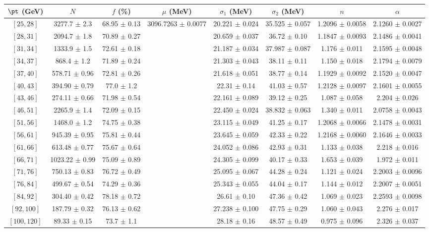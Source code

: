 \begin{tabular}{c||c|c|c|c|c|c|c}
$\pt$ (GeV) & $N$ & $f$ (\%) & $\mu$ (MeV) & $\sigma_1$ (MeV) & $\sigma_2$ (MeV) & $n$ & $\alpha$ \\
\hline
$[25, 28]$ & 3277.7 $\pm$ 2.3 & 68.95 $\pm$ 0.13 & \multirow{17}{*}{3096.7263 $\pm$ 0.0077} & 20.221 $\pm$ 0.024 & 35.525 $\pm$ 0.057 & 1.2096 $\pm$ 0.0058 & 2.1260 $\pm$ 0.0027\\
$[28, 31]$ & 2094.7 $\pm$ 1.8 & 70.89 $\pm$ 0.27 &  & 20.659 $\pm$ 0.037 & 36.72 $\pm$ 0.10 & 1.1847 $\pm$ 0.0093 & 2.1486 $\pm$ 0.0041\\
$[31, 34]$ & 1333.9 $\pm$ 1.5 & 72.61 $\pm$ 0.18 &  & 21.187 $\pm$ 0.034 & 37.987 $\pm$ 0.087 & 1.176 $\pm$ 0.011 & 2.1595 $\pm$ 0.0048\\
$[34, 37]$ & 868.4 $\pm$ 1.2 & 71.89 $\pm$ 0.24 &  & 21.303 $\pm$ 0.043 & 38.11 $\pm$ 0.11 & 1.150 $\pm$ 0.018 & 2.1794 $\pm$ 0.0079\\
$[37, 40]$ & 578.71 $\pm$ 0.96 & 72.81 $\pm$ 0.26 &  & 21.618 $\pm$ 0.051 & 38.77 $\pm$ 0.14 & 1.1929 $\pm$ 0.0092 & 2.1520 $\pm$ 0.0047\\
$[40, 43]$ & 394.90 $\pm$ 0.79 & 77.0 $\pm$ 1.2 &  & 22.31 $\pm$ 0.14 & 41.03 $\pm$ 0.57 & 1.2128 $\pm$ 0.0097 & 2.1601 $\pm$ 0.0055\\
$[43, 46]$ & 274.11 $\pm$ 0.66 & 71.98 $\pm$ 0.54 &  & 22.161 $\pm$ 0.089 & 39.12 $\pm$ 0.25 & 1.087 $\pm$ 0.058 & 2.204 $\pm$ 0.026\\
$[46, 51]$ & 2265.9 $\pm$ 1.4 & 72.09 $\pm$ 0.15 &  & 22.450 $\pm$ 0.024 & 38.832 $\pm$ 0.063 & 1.340 $\pm$ 0.011 & 2.0758 $\pm$ 0.0043\\
$[51, 56]$ & 1468.0 $\pm$ 1.2 & 74.75 $\pm$ 0.38 &  & 23.115 $\pm$ 0.049 & 41.25 $\pm$ 0.17 & 1.2068 $\pm$ 0.0066 & 2.1478 $\pm$ 0.0031\\
$[56, 61]$ & 945.39 $\pm$ 0.95 & 75.81 $\pm$ 0.44 &  & 23.645 $\pm$ 0.059 & 42.33 $\pm$ 0.22 & 1.2168 $\pm$ 0.0060 & 2.1646 $\pm$ 0.0033\\
$[61, 66]$ & 613.48 $\pm$ 0.77 & 75.67 $\pm$ 0.64 &  & 24.052 $\pm$ 0.086 & 42.93 $\pm$ 0.31 & 1.133 $\pm$ 0.038 & 2.218 $\pm$ 0.016\\
$[66, 71]$ & 1023.22 $\pm$ 0.99 & 75.09 $\pm$ 0.89 &  & 24.305 $\pm$ 0.099 & 40.17 $\pm$ 0.33 & 1.653 $\pm$ 0.039 & 1.972 $\pm$ 0.011\\
$[71, 76]$ & 750.13 $\pm$ 0.83 & 76.72 $\pm$ 0.49 &  & 25.095 $\pm$ 0.067 & 44.28 $\pm$ 0.24 & 1.121 $\pm$ 0.024 & 2.2003 $\pm$ 0.0096\\
$[76, 84]$ & 499.67 $\pm$ 0.54 & 74.29 $\pm$ 0.36 &  & 25.343 $\pm$ 0.055 & 44.04 $\pm$ 0.17 & 1.144 $\pm$ 0.012 & 2.2007 $\pm$ 0.0051\\
$[84, 92]$ & 304.40 $\pm$ 0.42 & 78.18 $\pm$ 0.72 &  & 26.61 $\pm$ 0.10 & 47.36 $\pm$ 0.42 & 1.069 $\pm$ 0.023 & 2.2593 $\pm$ 0.0098\\
$[92, 100]$ & 187.79 $\pm$ 0.32 & 76.13 $\pm$ 0.62 &  & 27.238 $\pm$ 0.100 & 47.75 $\pm$ 0.29 & 1.060 $\pm$ 0.043 & 2.276 $\pm$ 0.017\\
$[100, 120]$ & 89.33 $\pm$ 0.15 & 73.7 $\pm$ 1.1 &  & 28.18 $\pm$ 0.16 & 48.57 $\pm$ 0.49 & 0.975 $\pm$ 0.096 & 2.326 $\pm$ 0.037\\
\end{tabular}
